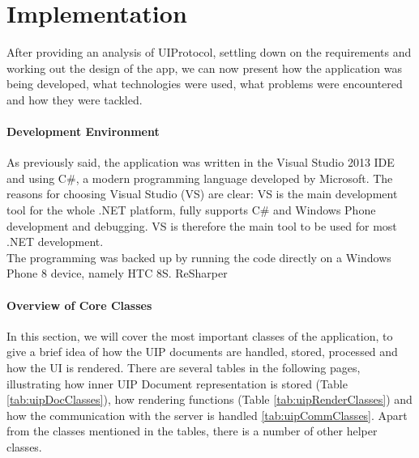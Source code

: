 \chapter{Implementation}
After providing an analysis of UIProtocol, settling down on the requirements and working out the design of the app, we can now present how the application was being developed, what technologies were used, what problems were encountered and how they were tackled.\\

\subsubsection{Development Environment}
As previously said, the application was written in the Visual Studio 2013 IDE and using C\#, a modern programming language developed by Microsoft. The reasons for choosing Visual Studio (VS) are clear: VS is the main development tool for the whole .NET platform, fully supports C\# and Windows Phone development and debugging. VS is therefore the main tool to be used for most .NET development.\\The programming was backed up by running the code directly on a Windows Phone 8 device, namely HTC 8S. ReSharper

\subsubsection{Overview of Core Classes}
In this section, we will cover the most important classes of the application, to give a brief idea of how the UIP documents are handled, stored, processed and how the UI is rendered. There are several tables in the following pages, illustrating how inner UIP Document representation is stored (Table \ref{tab:uipDocClasses}), how rendering functions (Table \ref{tab:uipRenderClasses}) and how the communication with the server is handled \ref{tab:uipCommClasses}. Apart from the classes mentioned in the tables, there is a number of other helper classes.








